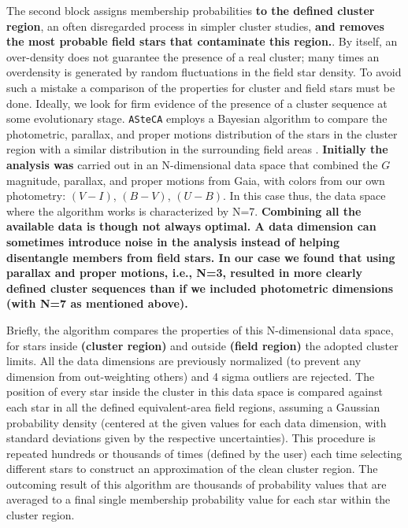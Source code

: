 \documentclass[referee]{aa}
\begin{document}
The second block assigns membership probabilities \textbf{to the defined
cluster region}, an often disregarded process in simpler cluster studies, 
\textbf{and removes the most probable field stars that contaminate this region.}.
By itself, an over-density does not guarantee the presence of a real cluster;
many times an overdensity is generated by random fluctuations in the field star
density. To avoid such a mistake a comparison of the properties for cluster and
field stars must be done. Ideally, we look for firm evidence of the presence of
a cluster sequence at some evolutionary stage. \texttt{ASteCA} employs a
Bayesian algorithm to compare the photometric, parallax, and proper motions
distribution of the stars in the cluster region with a similar distribution in
the surrounding field areas \citep{Perren_2015}. \textbf{Initially the analysis
was} carried out in an N-dimensional data space that combined the
$G$ magnitude, parallax, and proper motions from Gaia, with colors from our own
photometry: $(V-I)$, $(B-V)$, $(U-B)$. In this case thus, the data space where
the algorithm works is characterized by N=7.
\textbf{Combining all the available data is though not always optimal. A
data dimension can sometimes introduce noise in the analysis instead of helping
disentangle members from field stars. In our case we found that using
parallax and proper motions, i.e., N=3, resulted in more clearly defined
cluster sequences than if we included photometric dimensions (with N=7 as
mentioned above).
}

%
Briefly, the algorithm compares the properties of this N-dimensional data space,
for stars inside \textbf{(cluster region)} and outside \textbf{(field region)}
the adopted cluster limits. All the data dimensions are previously normalized 
(to prevent any dimension from out-weighting others) and 4 sigma outliers are
rejected.
The position of every star inside the cluster in this data space is compared
against each star in all the defined equivalent-area field regions,
assuming a Gaussian probability density (centered at the given values for each
data dimension, with standard deviations given by the respective
uncertainties). This procedure is repeated hundreds or thousands of times 
(defined by the user) each time selecting different stars to construct an
approximation of the clean cluster region. The outcoming result of this
algorithm are thousands of probability values that are averaged to a final
single membership probability value for each star within the cluster region.
\end{document}
